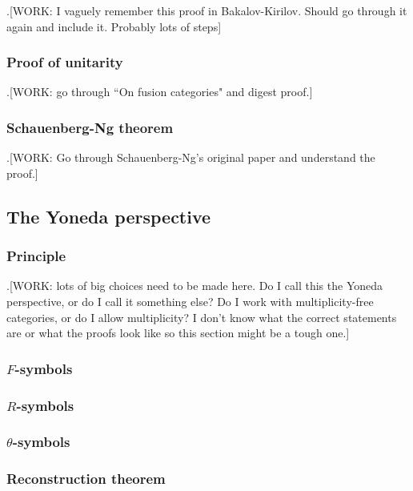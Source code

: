 .[WORK: I vaguely remember this proof in Bakalov-Kirilov. Should go through it again and include it. Probably lots of steps]

\subsubsection{Proof of unitarity}

.[WORK: go through ``On fusion categories" and digest proof.]

\subsubsection{Schauenberg-Ng theorem}

.[WORK: Go through Schauenberg-Ng's original paper and understand the proof.]


\subsection{The Yoneda perspective}

\subsubsection{Principle}

.[WORK: lots of big choices need to be made here. Do I call this the Yoneda perspective, or do I call it something else? Do I work with multiplicity-free categories, or do I allow multiplicity? I don't know what the correct statements are or what the proofs look like so this section might be a tough one.]

\subsubsection{$F$-symbols}

\subsubsection{$R$-symbols}

\subsubsection{$\theta$-symbols}

\subsubsection{Reconstruction theorem}



